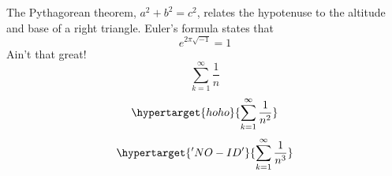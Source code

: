 The Pythagorean theorem, $a^2 + b^2 = c^2$,
relates the hypotenuse to the altitude
and base of a right triangle.
Euler’s formula states that
\[
e^{2\pi \sqrt{-1}} = 1
\]
Ain’t that great!
\begin{equation*}
\sum_{k=1}^\infty \frac{1}{n}
\end{equation*}
\begin{equation}
\label{hoho}\hypertarget{hoho}{\sum_{k=1}^\infty \frac{1}{n^2}}
\end{equation}
\begin{equation}
\hypertarget{'NO-ID'}{\sum_{k=1}^\infty \frac{1}{n^3}}
\end{equation}
